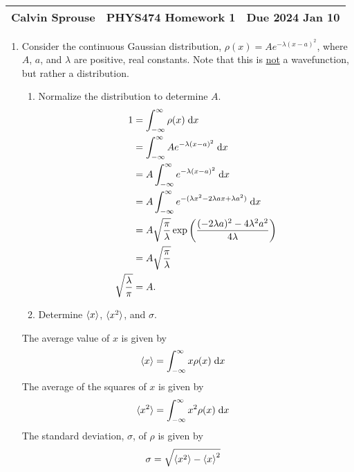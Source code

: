 \documentclass[a4paper, 12pt]{config/homework}
\begin{document}
\noindent
\begin{tabularx}{\textwidth}{>{\centering\arraybackslash}X>{\centering\arraybackslash}X>{\centering\arraybackslash}X}
Calvin Sprouse & PHYS474 Homework 1 & Due 2024 Jan 10\\
\midrule
\end{tabularx}

\begin{enumerate}
\item Consider the continuous Gaussian distribution, \(\rho(x) = Ae^{-\lambda (x-a)^2}\), where \(A\), \(a\), and \(\lambda \) are positive, real constants. Note that this is \underline{not} a wavefunction, but rather a distribution.
\begin{enumerate}[label=(\alph*)]
\item Normalize the distribution to determine \(A\).
\begin{align*}
1 &= \bint{-\infty}{\infty}{\rho(x)}{x}
\\&= \bint{-\infty}{\infty}{Ae^{-\lambda (x-a)^2}}{x}
\\&= A \bint{-\infty}{\infty}{e^{-\lambda (x-a)^2}}{x}
\\&= A \bint{-\infty}{\infty}{e^{-(\lambda x^2 -2\lambda ax + \lambda a^2)}}{x}
\\&= A \sqrt{\frac{\pi}{\lambda}} \exp\left({\frac{(-2\lambda a)^2 - 4\lambda^2 a^2}{4\lambda}}\right)
\\&= A \sqrt{\frac{\pi}{\lambda}}
\\\sqrt{\frac{\lambda}{\pi}} &= A.
\end{align*}

\item Determine \(\braket{x}\), \(\braket{x^2}\), and \(\sigma\).
\end{enumerate}
The average value of \(x\) is given by
\begin{align*}
\braket{x} &= \bint{-\infty}{\infty}{x \rho(x)}{x}
\end{align*}
The average of the squares of \(x\) is given by
\begin{align*}
\braket{x^2} &= \bint{-\infty}{\infty}{x^2 \rho(x)}{x}
\end{align*}
The standard deviation, \(\sigma \), of \(\rho \) is given by
\begin{align*}
\sigma &= \sqrt{\braket{x^2} - \braket{x}^2}
\end{align*}


\end{enumerate}
\end{document}
